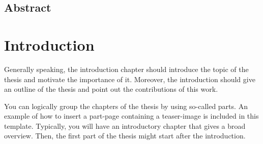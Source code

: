 \documentclass[a4paper,11pt,\myPageLayout]{book}
\begin{document}
\frontmatter
\newpage


\cleardoublepage{}

\pagestyle{mine}
\newpage

\section*{Abstract}

\mainmatter{}

\setcounter{tocdepth}{1}
\setcounter{page}{1}
{\parskip=0mm \tableofcontents}

\pagestyle{mine}

\cleardoublepage{}

\chapter{Introduction}
\label{chapter:Introduction}

Generally speaking, the introduction chapter should introduce the 
topic of the thesis and motivate the importance of it. Moreover, the
introduction should give an outline of the thesis and point out the 
contributions of this work.

You can logically group the chapters of the thesis
by using so-called parts. An example of how to insert a part-page 
containing a teaser-image is included in this template.
Typically, you will have an introductory chapter that gives a
broad overview. Then, the first part of the thesis might start after 
the introduction.
\end{document}
